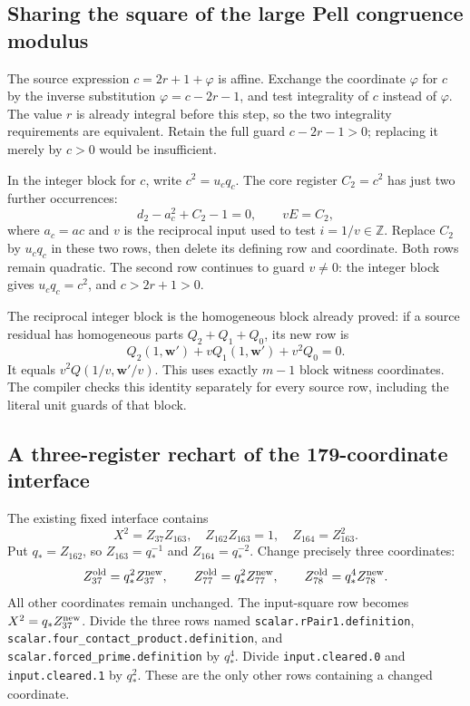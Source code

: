\documentclass[11pt]{article}
\newcommand{\Z}{\mathbb Z}
\begin{document}
\subsection{Sharing the square of the large Pell congruence modulus}
The source expression \(c=2r+1+\varphi\) is affine. Exchange the coordinate
\(\varphi\) for \(c\) by the inverse substitution
\(\varphi=c-2r-1\), and test integrality of \(c\) instead of
\(\varphi\). The value \(r\) is already integral before this step, so
the two integrality requirements are equivalent. Retain the full guard
\(c-2r-1>0\); replacing it merely by \(c>0\) would be insufficient.

In the integer block for \(c\), write \(c^2=u_cq_c\). The core register
\(C_2=c^2\) has just two further occurrences:
\[
                  d_2-a_c^2+C_2-1=0,
                  \qquad vE=C_2,
\]
where \(a_c=ac\) and \(v\) is the reciprocal input used to test
\(i=1/v\in\Z\). Replace \(C_2\) by \(u_cq_c\) in these two rows,
then delete its defining row and coordinate. Both rows remain quadratic.
The second row continues to guard \(v\ne0\): the integer block gives
\(u_cq_c=c^2\), and \(c>2r+1>0\).

The reciprocal integer block is the homogeneous block already proved:
if a source residual has homogeneous parts \(Q_2+Q_1+Q_0\), its new row is
\[
           Q_2(1,\mathbf w')+vQ_1(1,\mathbf w')+v^2Q_0=0.
\]
It equals \(v^2Q(1/v,\mathbf w'/v)\). This uses exactly \(m-1\) block
witness coordinates. The compiler checks this identity separately for
every source row, including the literal unit guards of that block.

\subsection{A three-register rechart of the 179-coordinate interface}
The existing fixed interface contains
\[
 X^2=Z_{37}Z_{163},\quad Z_{162}Z_{163}=1,
 \quad Z_{164}=Z_{163}^2.
\]
Put \(q_*=Z_{162}\), so \(Z_{163}=q_*^{-1}\) and
\(Z_{164}=q_*^{-2}\). Change precisely three coordinates:
\[
 Z_{37}^{\rm old}=q_*^2Z_{37}^{\rm new},\qquad
 Z_{77}^{\rm old}=q_*^2Z_{77}^{\rm new},\qquad
 Z_{78}^{\rm old}=q_*^4Z_{78}^{\rm new}.
\]
All other coordinates remain unchanged. The input-square row becomes
\(X^2=q_*Z_{37}^{\rm new}\). Divide the three rows named
\nolinkurl{scalar.rPair1.definition},
\nolinkurl{scalar.four_contact_product.definition}, and
\nolinkurl{scalar.forced_prime.definition} by \(q_*^4\).
Divide \nolinkurl{input.cleared.0} and \nolinkurl{input.cleared.1} by \(q_*^2\).
These are the only other rows containing a changed coordinate.
\end{document}
